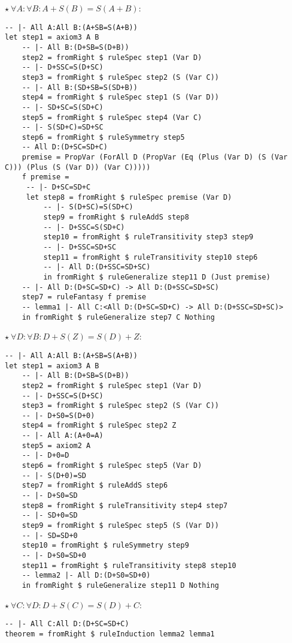 \documentclass{article}
\begin{document}
\begin{minipage}[t]{0.53\textwidth}
$\star \ \forall A: \forall B: A + S(B) = S(A + B)$:

\begin{lstlisting}
-- |- All A:All B:(A+SB=S(A+B))
let step1 = axiom3 A B
    -- |- All B:(D+SB=S(D+B))
    step2 = fromRight $ ruleSpec step1 (Var D)
    -- |- D+SSC=S(D+SC)
    step3 = fromRight $ ruleSpec step2 (S (Var C))
    -- |- All B:(SD+SB=S(SD+B))
    step4 = fromRight $ ruleSpec step1 (S (Var D))
    -- |- SD+SC=S(SD+C)
    step5 = fromRight $ ruleSpec step4 (Var C)
    -- |- S(SD+C)=SD+SC
    step6 = fromRight $ ruleSymmetry step5
    -- All D:(D+SC=SD+C)
    premise = PropVar (ForAll D (PropVar (Eq (Plus (Var D) (S (Var C))) (Plus (S (Var D)) (Var C)))))
    f premise =
     -- |- D+SC=SD+C
     let step8 = fromRight $ ruleSpec premise (Var D)
         -- |- S(D+SC)=S(SD+C)
         step9 = fromRight $ ruleAddS step8
         -- |- D+SSC=S(SD+C)
         step10 = fromRight $ ruleTransitivity step3 step9
         -- |- D+SSC=SD+SC
         step11 = fromRight $ ruleTransitivity step10 step6
         -- |- All D:(D+SSC=SD+SC)
         in fromRight $ ruleGeneralize step11 D (Just premise)
    -- |- All D:(D+SC=SD+C) -> All D:(D+SSC=SD+SC)
    step7 = ruleFantasy f premise
    -- lemma1 |- All C:<All D:(D+SC=SD+C) -> All D:(D+SSC=SD+SC)>
    in fromRight $ ruleGeneralize step7 C Nothing
\end{lstlisting}
\end{minipage}
\begin{minipage}[t]{0.45\textwidth}
$\star \ \forall D: \forall B: D + S(Z) = S(D) + Z$:

\begin{lstlisting}
-- |- All A:All B:(A+SB=S(A+B))
let step1 = axiom3 A B
    -- |- All B:(D+SB=S(D+B))
    step2 = fromRight $ ruleSpec step1 (Var D)
    -- |- D+SSC=S(D+SC)
    step3 = fromRight $ ruleSpec step2 (S (Var C))
    -- |- D+S0=S(D+0)
    step4 = fromRight $ ruleSpec step2 Z
    -- |- All A:(A+0=A)
    step5 = axiom2 A
    -- |- D+0=D
    step6 = fromRight $ ruleSpec step5 (Var D)
    -- |- S(D+0)=SD
    step7 = fromRight $ ruleAddS step6
    -- |- D+S0=SD
    step8 = fromRight $ ruleTransitivity step4 step7
    -- |- SD+0=SD
    step9 = fromRight $ ruleSpec step5 (S (Var D))
    -- |- SD=SD+0
    step10 = fromRight $ ruleSymmetry step9
    -- |- D+S0=SD+0
    step11 = fromRight $ ruleTransitivity step8 step10
    -- lemma2 |- All D:(D+S0=SD+0)
    in fromRight $ ruleGeneralize step11 D Nothing
\end{lstlisting}

$\star \ \forall C: \forall D: D + S(C) = S(D) + C$:

\begin{lstlisting}
-- |- All C:All D:(D+SC=SD+C)
theorem = fromRight $ ruleInduction lemma2 lemma1
\end{lstlisting}
\end{minipage}
\end{document}

